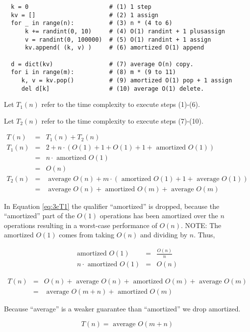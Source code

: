 \documentclass{article}
\begin{document}
\begin{enumerate}[label=(\alph*)]
\begin{verbatim}
  k = 0                       # (1) 1 step
  kv = []                     # (2) 1 assign
  for _ in range(n):          # (3) n * (4 to 6)
      k += randint(0, 10)     # (4) O(1) randint + 1 plusassign
      v = randint(0, 100000)  # (5) O(1) randint + 1 assign
      kv.append( (k, v) )     # (6) amortized O(1) append

  d = dict(kv)                # (7) average O(n) copy.
  for i in range(m):          # (8) m * (9 to 11)
     k, v = kv.pop()          # (9) amortized O(1) pop + 1 assign
     del d[k]                 # (10) average O(1) delete.
\end{verbatim}

Let $T_1(n)$ refer to the time complexity to execute steps (1)-(6).

Let $T_2(n)$ refer to the time complexity to execute steps (7)-(10). 

\begin{eqnarray}
  T(n) &=& T_1(n) + T_2(n) \\
  T_1(n) &=& 2 + n \cdot (O(1) + 1 + O(1) + 1 + \text{ amortized } O(1)) \\
  &=& n \cdot \text{ amortized } O(1) \\
  &=& O(n) \label{eq:3cT1} \\
  T_2(n) &=& \text{ average } O(n)
  + m \cdot (\text{ amortized } O(1) + 1 + \text{ average } O(1)) \\
  &=& \text{ average } O(n) + \text{ amortized } O(m) +
  \text{ average } O(m) \label{eq:3cT2} 
\end{eqnarray}

In Equation \ref{eq:3cT1} the qualifier ``amortized'' is dropped,
because the ``amortized'' part of the $O(1)$ operations has been
amortized over the $n$ operations resulting in a worst-case
performance of $O(n)$.  NOTE: The amortized $O(1)$ comes from taking
$O(n)$ and dividing by $n$.  Thus,

\begin{eqnarray*}
  \text{amortized } O(1) &=& \frac{O(n)}{n} \\
  n \cdot \text{ amortized } O(1) &=& O(n)
\end{eqnarray*}

\begin{eqnarray*}
  T(n) &=& O(n) + \text{ average } O(n) + \text{ amortized } O(m) +
  \text{ average } O(m) \\
       &=& \text{ average } O(m + n) + \text{ amortized } O(m)
\end{eqnarray*}

Because ``average'' is a weaker guarantee than ``amortized'' we drop
amortized.

\begin{equation}
  \boxed{T(n) = \text{ average } O(m + n)}
\end{equation}

\end{enumerate}
\end{document}
